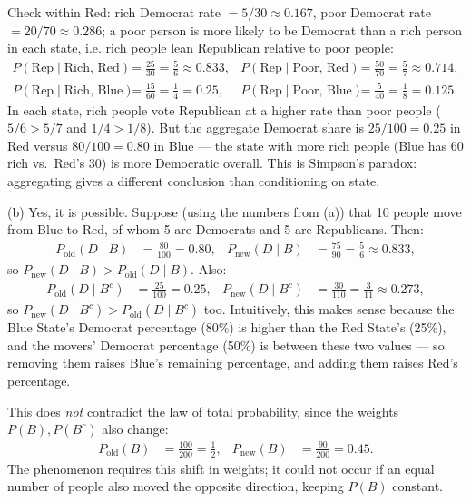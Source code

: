 \documentclass[11pt]{article}
\begin{document}
\medskip
Check within Red: rich Democrat rate $= 5/30 \approx 0.167$, poor Democrat rate $=20/70\approx 0.286$; a poor person is more likely to be Democrat than a rich person in each state, i.e. rich people lean Republican relative to poor people:
\begin{align*}
P(\text{Rep}\mid\text{Rich, Red}) &= \frac{25}{30} = \frac56 \approx 0.833, &
P(\text{Rep}\mid\text{Poor, Red}) &= \frac{50}{70} = \frac57 \approx 0.714,\\
P(\text{Rep}\mid\text{Rich, Blue}) &= \frac{15}{60} = \frac14 = 0.25, &
P(\text{Rep}\mid\text{Poor, Blue}) &= \frac{5}{40} = \frac18 = 0.125.
\end{align*}
In each state, rich people vote Republican at a higher rate than poor people ($5/6 > 5/7$ and $1/4 > 1/8$). But the aggregate Democrat share is $25/100=0.25$ in Red versus $80/100 = 0.80$ in Blue — the state with more rich people (Blue has 60 rich vs.\ Red's 30) is more Democratic overall. This is Simpson's paradox: aggregating gives a different conclusion than conditioning on state.

(b) Yes, it is possible. Suppose (using the numbers from (a)) that 10 people move from Blue to Red, of whom 5 are Democrats and 5 are Republicans. Then:
\begin{align*}
P_{\text{old}}(D\mid B) &= \frac{80}{100} = 0.80, &
P_{\text{new}}(D\mid B) &= \frac{75}{90} = \frac{5}{6} \approx 0.833,
\end{align*}
so $P_{\text{new}}(D\mid B) > P_{\text{old}}(D\mid B)$. Also:
\begin{align*}
P_{\text{old}}(D\mid B^c) &= \frac{25}{100} = 0.25, &
P_{\text{new}}(D\mid B^c) &= \frac{30}{110} = \frac{3}{11} \approx 0.273,
\end{align*}
so $P_{\text{new}}(D\mid B^c) > P_{\text{old}}(D\mid B^c)$ too. Intuitively, this makes sense because the Blue State's Democrat percentage (80\%) is higher than the Red State's (25\%), and the movers' Democrat percentage (50\%) is between these two values — so removing them raises Blue's remaining percentage, and adding them raises Red's percentage.

This does \emph{not} contradict the law of total probability, since the weights $P(B), P(B^c)$ also change:
\begin{align*}
P_{\text{old}}(B) &= \frac{100}{200} = \frac12, &
P_{\text{new}}(B) &= \frac{90}{200} = 0.45.
\end{align*}
The phenomenon requires this shift in weights; it could not occur if an equal number of people also moved the opposite direction, keeping $P(B)$ constant.
\end{document}
